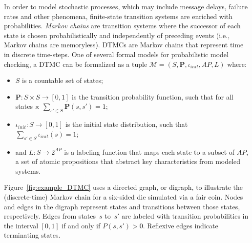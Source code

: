 In order to model stochastic processes, which may include message delays, failure rates and other phenomena, finite-state transition systems are enriched with probabilities. \emph{Markov chains} are transition systems where the successor of each state is chosen probabilistically and independently of preceding events (i.e., Markov chains are memoryless). DTMCs are Markov chains that represent time in discrete time-steps. One of several formal models for probabilistic model checking, a DTMC can be formalized as a tuple $\mathcal{M} = (S, \mathbf{P}, \iota_{init}, AP, L)$ where:

\begin{itemize}

\item $S$ is a countable set of states;

\item $\mathbf{P}: S \times S \rightarrow [0, 1]$ is the transition probability function, such that for all states \emph{s}: $\sum_{s' \in S} \mathbf{P}(s, s') = 1$;

\item $\iota_{init}: S \rightarrow [0, 1]$ is the initial state distribution, such that $\sum_{s' \in S} \iota_{init}(s) = 1$;

\item and $L: S \rightarrow 2^{AP}$ is a labeling function that maps each state to a subset of $AP$, a set of atomic propositions that abstract key characteristics from modeled systems.

\end{itemize}

Figure~\ref{fig:example_DTMC} uses a directed graph, or digraph, to illustrate the (discrete-time) Markov chain for a six-sided die simulated via a fair coin. Nodes and edges in the digraph represent states and transitions between those states, respectively. Edges from states~$s$ to~$s'$ are labeled with transition probabilities in the interval $[0, 1]$ if and only if $P(s, s') > 0$. Reflexive edges indicate terminating states.

